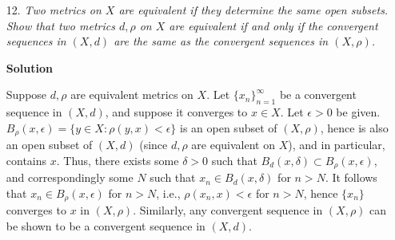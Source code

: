 \documentclass{article}
\begin{document}
\begin{enumerate}
\begin{itemize}
{\bf Solution}

First note that the properties of being a limit point and of being an isolated point are mutually exclusive (that is, a point cannot be both a limit point and an isolated point).  Thus, we aim to show that every adherent point of \(S \subset X\) is either a limit point of \(S\) or an isolated point of \(S\).  Indeed, suppose \(x \in X\) was adherent to \(S\), i.e., \(B(x;r) \cap S \neq \emptyset\) for all \(r > 0\).  Either \(x\) is a limit point of \(S\) (in which case we're done), or there exists some \(r\) such that \(B(x;r)\) contains finitely many points of \(S\).  Set \(h = \min_{y \in B(x;r) \cap S \backslash \{x\}} d(x, y)\), or \(h = r\) in the case that \(B(x;r) \cap S \backslash \{x\} = \emptyset\).  Note that \(h > 0\) and \(B(x;h) \cap S\) has no points in common with \(B(x;r) \cap S \backslash \{x\}\).  Yet \(B(x;h) \subset B(x;r)\), and \(B(x;h) \cap S \neq \emptyset\) (since \(x\) is adherent to \(S\)), so we must have that \(B(x;h) = \{x\}\), showing that \(x\) is, in fact, an isolated point of \(S\).



\item[12.] {\em Two metrics on \(X\) are {\em equivalent} if they determine the same open subsets.  Show that two metrics \(d,\rho\) on \(X\) are {\em equivalent} if and only if the convergent sequences in \((X,d)\) are the same as the convergent sequences in \((X,\rho)\).}

{\bf Solution}

Suppose \(d,\rho\) are equivalent metrics on \(X\).  Let \(\{x_n\}_{n = 1}^{\infty}\) be a convergent sequence in \((X,d)\), and suppose it converges to \(x \in X\).  Let \(\epsilon > 0\) be given.  \(B_{\rho}(x,\epsilon) = \{y \in X : \rho(y,x) < \epsilon\}\) is an open subset of \((X,\rho)\), hence is also an open subset of \((X, d)\) (since \(d,\rho\) are equivalent on \(X\)), and in particular, contains \(x\).  Thus, there exists some \(\delta > 0\) such that \(B_d(x,\delta) \subset B_{\rho}(x,\epsilon)\), and correspondingly some \(N\) such that \(x_n \in B_d(x,\delta)\) for \(n > N\).  It follows that \(x_n \in B_{\rho}(x,\epsilon)\) for \(n > N\), i.e., \(\rho(x_n,x) < \epsilon\) for \(n > N\), hence \(\{x_n\}\) converges to \(x\) in \((X,\rho)\).  Similarly, any convergent sequence in \((X,\rho)\) can be shown to be a convergent sequence in \((X,d)\).


\end{itemize}
\end{enumerate}
\end{document}
